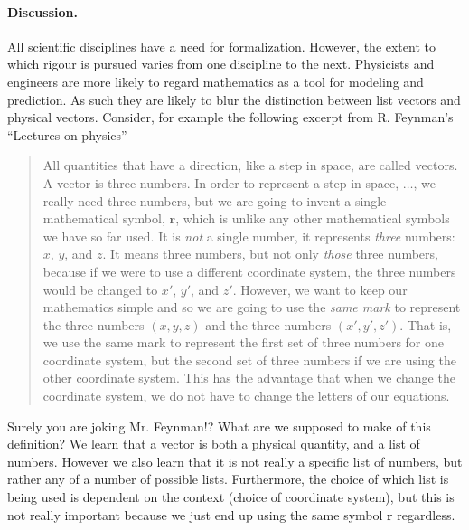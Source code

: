 \documentclass[12pt]{article}
\begin{document}
\paragraph{Discussion.}
All scientific disciplines have a need for formalization.  However,
the extent to which rigour is pursued varies from one discipline to
the next.  Physicists and engineers are more likely to regard
mathematics as a tool for modeling and prediction.  As such they are
likely to blur the distinction between list vectors and physical
vectors.  Consider, for example the following excerpt from R.
Feynman's ``Lectures on physics'' \cite{feynman}
\begin{quote}
  All quantities that have a direction, like a step in space, are
  called vectors.  A vector is three numbers.  In order to represent a
  step in space, $\ldots$, we really need three numbers, but we are
  going to invent a single mathematical symbol, $\mathbf{r}$, which is
  unlike any other mathematical symbols we have so far used.  It is
  {\em not} a single number, it represents {\em three} numbers: $x$,
  $y$, and $z$.  It means three numbers, but not only {\em those}
  three numbers, because if we were to use a different coordinate
  system, the three numbers would be changed to $x'$, $y'$, and $z'$.
  However, we want to keep our mathematics simple and so we are going
  to use the {\em same mark} to represent the three numbers $(x,y,z)$
  and the three numbers $(x',y',z')$.  That is, we use the same mark
  to represent the first set of three numbers for one coordinate
  system, but the second set of three numbers if we are using the
  other coordinate system.  This has the advantage that when we change
  the coordinate system, we do not have to change the letters of our
  equations.
\end{quote}
Surely you are joking Mr. Feynman!?  What are we supposed to make of
this definition?  We learn that a vector is both a physical quantity,
and a list of numbers. However we also learn that it is not really a
specific list of numbers, but rather any of a number of possible
lists.  Furthermore, the choice of which list is being used is
dependent on the context (choice of coordinate system), but this is
not really important because we just end up using the same symbol
$\mathbf{r}$ regardless.  
\end{document}
